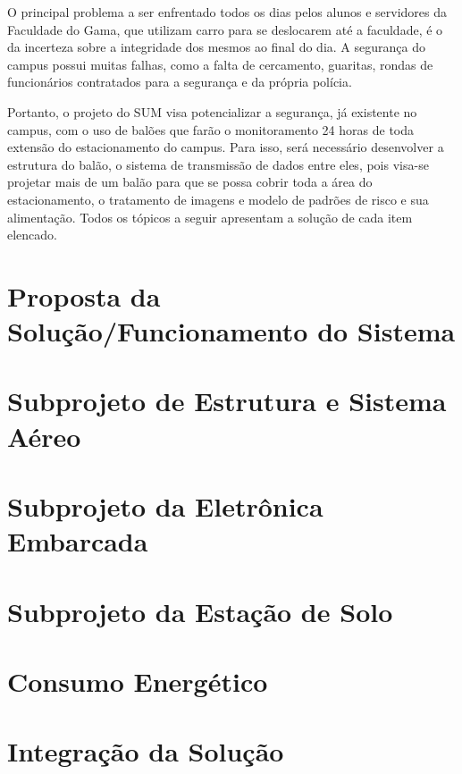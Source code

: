   O principal problema a ser enfrentado todos os dias pelos alunos e servidores da Faculdade do Gama, que utilizam carro para se deslocarem até a faculdade, é o da incerteza sobre a integridade dos mesmos ao final do dia. A segurança do campus possui muitas falhas, como a falta de cercamento, guaritas, rondas de funcionários contratados para a segurança e da própria polícia.

	Portanto, o projeto do SUM visa potencializar a segurança, já existente no campus, com o uso de balões que farão o monitoramento 24 horas de toda extensão do estacionamento do campus. Para isso, será necessário desenvolver a estrutura do balão, o sistema de transmissão de dados entre eles, pois visa-se projetar mais de um balão para que se possa cobrir toda a área do estacionamento, o tratamento de imagens e modelo de padrões de risco e sua alimentação. Todos os tópicos a seguir apresentam a solução de cada item elencado.

\section{Proposta da Solução/Funcionamento do Sistema} %
\label{sec:proposta_da_solu_o_funcionamento_do_sistema}


\section{Subprojeto de Estrutura e Sistema Aéreo} %
\label{sec:subprojeto_de_estrutura_e_sistema_a_reo}


\section{Subprojeto da Eletrônica Embarcada} %
\label{sec:subprojeto_da_eletr_nica_embarcada}


\section{Subprojeto da Estação de Solo} %
\label{sec:subprojeto_da_esta_o_de_solo}


\section{Consumo Energético} %
\label{sec:consumo_energ_tico}



\section{Integração da Solução} %
\label{sec:integra_o_da_solu_o}

